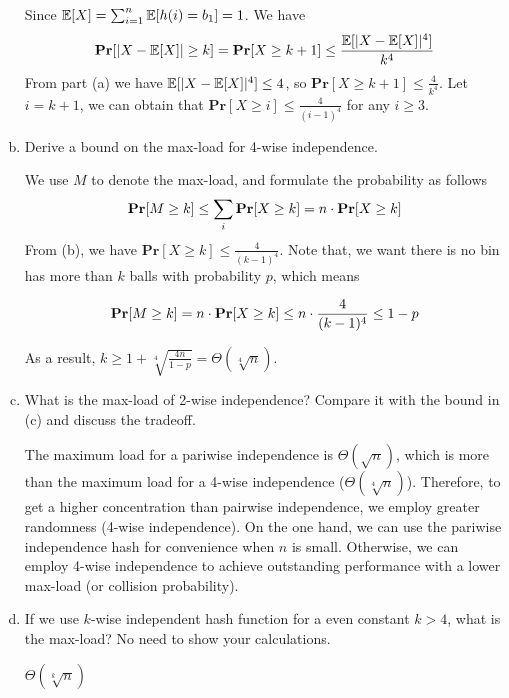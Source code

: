 \begin{problem}[30 points]
\begin{enumerate}[(a)]
Since $\operatorname*{\mathbb{E}}[X] = \sum_{i=1}^{n}{\operatorname*{\mathbb{E}}[h(i) = b_1]} = 1$. We have 
\begin{equation}
    \mathbf{Pr}[|X - \operatorname*{\mathbb{E}}[X]| \ge k] = \mathbf{Pr}[X \ge k + 1]\le \frac{\operatorname*{\mathbb{E}}[|X - \operatorname*{\mathbb{E}}[X]|^4]}{k^4}
\end{equation}
From part (a) we have $\operatorname*{\mathbb{E}}[|X - \operatorname*{\mathbb{E}}[X]|^4] \le 4$, so $\mathbf{Pr}[X \ge k + 1]\le \frac{4}{k^4}$. Let $i=k+1$, we can obtain that $\mathbf{Pr}[X \ge i]\le \frac{4}{(i-1)^4}$ for any $i \ge 3$.


\item Derive a bound on the max-load for 4-wise independence.

\Answer

We use $M$ to denote the max-load, and formulate the probability as follows
\begin{equation}
    \mathbf{Pr}[M \ge k] \le \sum_{i} \mathbf{Pr}[X \ge k] = n \cdot \mathbf{Pr}[X \ge k] \notag
\end{equation}
From (b), we have $ \mathbf{Pr}[X \ge k]\le \frac{4}{(k-1)^4}$. Note that, we want there is no bin has more than $k$ balls with probability $p$, which means

\begin{equation}
     \mathbf{Pr}[M \ge k] = n \cdot  \mathbf{Pr}[X \ge k] \le n \cdot \frac{4}{(k-1)^4} \le 1-p \notag
\end{equation}

As a result, $k \ge 1 + \sqrt[4]{\frac{4n}{1-p}} = \Theta(\sqrt[4]{n})$.

\item What is the max-load of 2-wise independence? Compare it with the bound in (c) and discuss the tradeoff.

\Answer
The maximum load for a pariwise independence is $\Theta(\sqrt{n})$, which is more than the maximum load for a 4-wise independence ($\Theta(\sqrt[4]{n})$).
Therefore, to get a higher concentration than pairwise independence, we employ greater randomness (4-wise independence).
On the one hand, we can use the pariwise independence hash for convenience when $n$ is small. Otherwise, we can employ 4-wise independence to achieve outstanding performance with a lower max-load (or collision probability).


\item If we use $k$-wise independent hash function for a even constant $k > 4$, what is the max-load? No need to show your calculations.

\Answer $\Theta(\sqrt[k]{n})$

\end{enumerate}
\end{problem}

